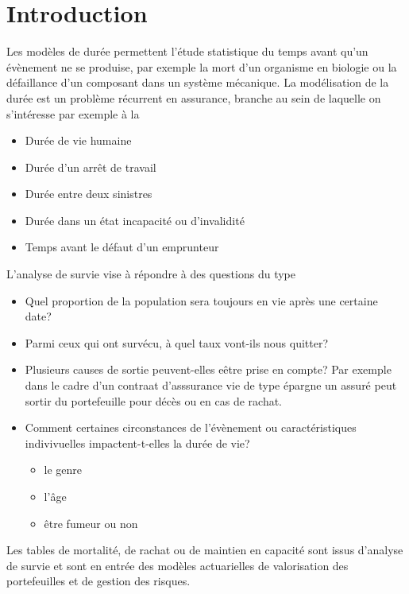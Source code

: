 \chapter{Introduction}\label{sec:introduction}
Les modèles de durée permettent l'étude statistique du temps avant qu'un évènement ne se produise, par exemple la mort d'un organisme en biologie ou la défaillance d'un composant dans un système mécanique. La modélisation de la durée est un problème récurrent en assurance, branche au sein de laquelle on s'intéresse par exemple à la
\begin{itemize}
    \item Durée de vie humaine
    \item Durée d'un arrêt de travail
    \item Durée entre deux sinistres
    \item Durée dans un état incapacité ou d'invalidité 
    \item Temps avant le défaut d'un emprunteur
\end{itemize}
L'analyse de survie vise à répondre à des questions du type
\begin{itemize}
    \item Quel proportion de la population sera toujours en vie après une certaine date?
    \item Parmi ceux qui ont survécu, à quel taux vont-ils nous quitter?
    \item Plusieurs causes de sortie peuvent-elles eêtre prise en compte? Par exemple dans le cadre d'un contraat d'asssurance vie de type épargne un assuré peut sortir du portefeuille pour décès ou en cas de rachat. 
    \item Comment certaines circonstances de l'évènement ou caractéristiques indivivuelles impactent-t-elles la durée de vie?
    \begin{itemize}
    \item le genre
    \item l'âge
    \item être fumeur ou non
  \end{itemize}
\end{itemize}
Les tables de mortalité, de rachat ou de maintien en capacité sont issus d'analyse de survie et sont en entrée des modèles actuarielles de valorisation des portefeuilles et de gestion des risques. 

